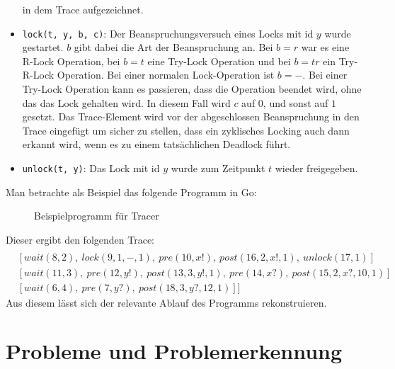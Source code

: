 \begin{itemize}
    in dem Trace aufgezeichnet.
  \item \texttt{lock(t, y, b, c)}: Der Beanspruchungsversuch eines Locks mit id $y$ wurde gestartet. 
    $b$ gibt dabei die Art der Beanspruchung an. Bei $b = r$ war es eine R-Lock
    Operation, bei $b = t$ eine Try-Lock Operation und bei $b = tr$ ein Try-R-Lock
    Operation. Bei einer normalen Lock-Operation ist $b = -$. Bei einer 
    Try-Lock Operation kann es passieren, dass die Operation beendet wird, 
    ohne das das Lock gehalten wird. In diesem Fall wird $c$ auf $0$, und 
    sonst auf $1$ gesetzt. Das Trace-Element wird vor der abgeschlossen 
    Beanspruchung in den Trace eingefügt um sicher zu stellen, dass 
    ein zyklisches Locking auch dann erkannt wird, wenn es zu einem 
    tatsächlichen Deadlock führt. 
  \item \texttt{unlock(t, y)}: Das Lock mit id $y$ wurde zum Zeitpunkt 
    $t$ wieder freigegeben. 
\end{itemize}


Man betrachte als Beispiel das folgende Programm in Go:
\begin{figure}
  
  \caption{Beispielprogramm für Tracer}
  \label{Chap:Tracer-Sec:Trace-Fig:Example}
\end{figure}
% 
Dieser ergibt den folgenden Trace:
\begin{align*}
  [&[signal(1, 2),\ signal(2, 3),\ signal(3, 4),\ pre(4, a?, default),\ post(5, default)]\\
  &[wait(8, 2),\ lock(9, 1, -, 1),\ pre(10, x!),\ post(16, 2, x!, 1),\ unlock(17, 1)]\\
  &[wait(11, 3),\ pre(12, y!),\ post(13, 3, y!, 1),\ pre(14, x?),\ post(15, 2, x?, 10, 1)]\\
  &[wait(6, 4),\ pre(7, y?),\ post(18, 3, y?, 12, 1)]]
\end{align*}
Aus diesem lässt sich der relevante Ablauf des Programms rekonstruieren.




\section{Probleme und Problemerkennung}\label{Chap:Back-Sec:Prob}

